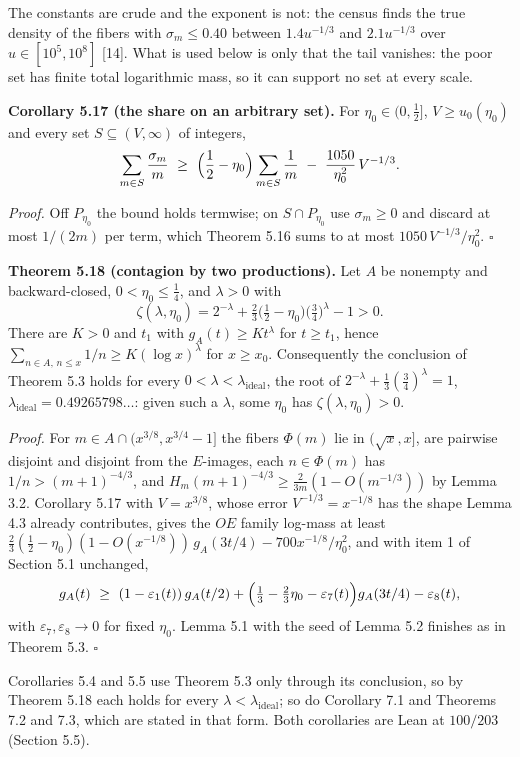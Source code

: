 \documentclass[11pt,a4paper]{article}
\begin{document}
The constants are crude and the exponent is not: the census finds the
true density of the fibers with \(\sigma_m\le0.40\) between
\(1.4u^{-1/3}\) and \(2.1u^{-1/3}\) over \(u\in[10^5,10^8]\) {[}14{]}.
What is used below is only that the tail vanishes: the poor set has
finite total logarithmic mass, so it can support no set at every scale.

\textbf{Corollary 5.17 (the share on an arbitrary set).} For
\(\eta_0\in(0,\tfrac12]\), \(V\ge u_0(\eta_0)\) and every set
\(S\subseteq(V,\infty)\) of integers, \[
\sum_{m\in S}\frac{\sigma_m}{m}\ \ge\ \Bigl(\frac12-\eta_0\Bigr)\sum_{m\in S}\frac1m\ -\ \frac{1050}{\eta_0^2}\,V^{-1/3}.
\]

\emph{Proof.} Off \(P_{\eta_0}\) the bound holds termwise; on
\(S\cap P_{\eta_0}\) use \(\sigma_m\ge0\) and discard at most \(1/(2m)\)
per term, which Theorem 5.16 sums to at most
\(1050\,V^{-1/3}/\eta_0^2\). \(\square\)

\textbf{Theorem 5.18 (contagion by two productions).} Let \(A\) be
nonempty and backward-closed, \(0<\eta_0\le\tfrac14\), and \(\lambda>0\)
with \[
\zeta(\lambda,\eta_0)=2^{-\lambda}+\tfrac23\bigl(\tfrac12-\eta_0\bigr)\bigl(\tfrac34\bigr)^{\lambda}-1>0.
\] There are \(K>0\) and \(t_1\) with \(g_A(t)\ge Kt^{\lambda}\) for
\(t\ge t_1\), hence \(\sum_{n\in A,\,n\le x}1/n\ge K(\log x)^\lambda\)
for \(x\ge x_0\). Consequently the conclusion of Theorem 5.3 holds for
every \(0<\lambda<\lambda_{\mathrm{ideal}}\), the root of
\(2^{-\lambda}+\tfrac13(\tfrac34)^\lambda=1\),
\(\lambda_{\mathrm{ideal}}=0.49265798\ldots\): given such a \(\lambda\),
some \(\eta_0\) has \(\zeta(\lambda,\eta_0)>0\).

\emph{Proof.} For \(m\in A\cap(x^{3/8},x^{3/4}-1]\) the fibers
\(\Phi(m)\) lie in \((\sqrt x,x]\), are pairwise disjoint and disjoint
from the \(E\)-images, each \(n\in\Phi(m)\) has \(1/n>(m+1)^{-4/3}\),
and \(H_m(m+1)^{-4/3}\ge\tfrac2{3m}(1-O(m^{-1/3}))\) by Lemma 3.2.
Corollary 5.17 with \(V=x^{3/8}\), whose error \(V^{-1/3}=x^{-1/8}\) has
the shape Lemma 4.3 already contributes, gives the \(OE\) family
log-mass at least
\(\tfrac23(\tfrac12-\eta_0)(1-O(x^{-1/8}))\,g_A(3t/4)-700x^{-1/8}/\eta_0^2\),
and with item 1 of Section 5.1 unchanged, \[
g_A(t)\ \ge\ (1-\varepsilon_1(t))\,g_A(t/2)
+\Bigl(\tfrac13-\tfrac23\eta_0-\varepsilon_7(t)\Bigr)g_A(3t/4)-\varepsilon_8(t),
\] with \(\varepsilon_7,\varepsilon_8\to0\) for fixed \(\eta_0\). Lemma
5.1 with the seed of Lemma 5.2 finishes as in Theorem 5.3. \(\square\)

Corollaries 5.4 and 5.5 use Theorem 5.3 only through its conclusion, so
by Theorem 5.18 each holds for every
\(\lambda<\lambda_{\mathrm{ideal}}\); so do Corollary 7.1 and Theorems
7.2 and 7.3, which are stated in that form. Both corollaries are Lean at
\(100/203\) (Section 5.5).
\end{document}
